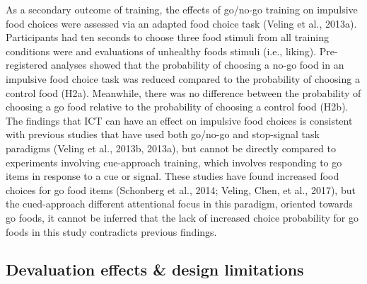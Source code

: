 \documentclass[man,floatsintext]{apa6}
\begin{document}
\par

As a secondary outcome of training, the effects of go/no-go training on impulsive food choices were assessed via an adapted food choice task (Veling et al., 2013a). Participants had ten seconds to choose three food stimuli from all training conditions were and evaluations of unhealthy foods stimuli (i.e., liking). Pre-registered analyses showed that the probability of choosing a no-go food in an impulsive food choice task was reduced compared to the probability of choosing a control food (H2a). Meanwhile, there was no difference between the probability of choosing a go food relative to the probability of choosing a control food (H2b). The findings that ICT can have an effect on impulsive food choices is consistent with previous studies that have used both go/no-go and stop-signal task paradigms (Veling et al., 2013b, 2013a), but cannot be directly compared to experiments involving cue-approach training, which involves responding to go items in response to a cue or signal. These studies have found increased food choices for go food items (Schonberg et al., 2014; Veling, Chen, et al., 2017), but the cued-approach different attentional focus in this paradigm, oriented towards go foods, it cannot be inferred that the lack of increased choice probability for go foods in this study contradicts previous findings.

\hypertarget{devaluation-effects-design-limitations}{%
\subsection{Devaluation effects \& design limitations}\label{devaluation-effects-design-limitations}}

\par
\end{document}
